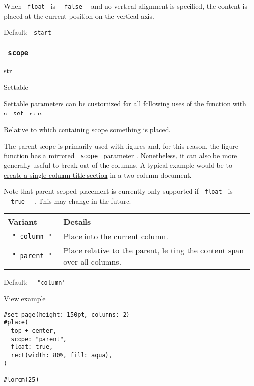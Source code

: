 When \texttt{\ float\ } is \texttt{\ }{\texttt{\ false\ }}\texttt{\ }
and no vertical alignment is specified, the content is placed at the
current position on the vertical axis.

Default: \texttt{\ start\ }

\subsubsection{\texorpdfstring{\texttt{\ scope\ }}{ scope }}\label{parameters-scope}

\href{/docs/reference/foundations/str/}{str}

{{ Settable }}

\label{parameters-scope-settable-tooltip}
Settable parameters can be customized for all following uses of the
function with a \texttt{\ set\ } rule.

Relative to which containing scope something is placed.

The parent scope is primarily used with figures and, for this reason,
the figure function has a mirrored
\href{/docs/reference/model/figure/\#parameters-scope}{\texttt{\ scope\ }
parameter} . Nonetheless, it can also be more generally useful to break
out of the columns. A typical example would be to
\href{/docs/guides/page-setup-guide/\#columns}{create a single-column
title section} in a two-column document.

Note that parent-scoped placement is currently only supported if
\texttt{\ float\ } is \texttt{\ }{\texttt{\ true\ }}\texttt{\ } . This
may change in the future.

\begin{longtable}[]{@{}ll@{}}
\toprule\noalign{}
Variant & Details \\
\midrule\noalign{}
\endhead
\bottomrule\noalign{}
\endlastfoot
\texttt{\ "\ column\ "\ } & Place into the current column. \\
\texttt{\ "\ parent\ "\ } & Place relative to the parent, letting the
content span over all columns. \\
\end{longtable}

Default: \texttt{\ }{\texttt{\ "column"\ }}\texttt{\ }


View example

\begin{verbatim}
#set page(height: 150pt, columns: 2)
#place(
  top + center,
  scope: "parent",
  float: true,
  rect(width: 80%, fill: aqua),
)

#lorem(25)
\end{verbatim}

